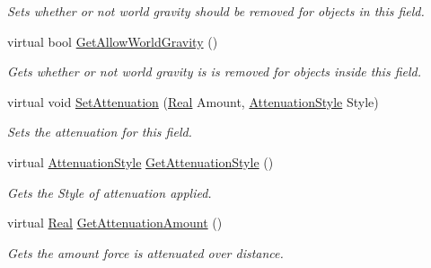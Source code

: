 \begin{DoxyCompactItemize}
\begin{DoxyCompactList}\small\item\em Sets whether or not world gravity should be removed for objects in this field. \item\end{DoxyCompactList}\item 
virtual bool \hyperlink{classphys_1_1GravityWell_a6308d71921477e9031173e6900237f21}{GetAllowWorldGravity} ()
\begin{DoxyCompactList}\small\item\em Gets whether or not world gravity is is removed for objects inside this field. \item\end{DoxyCompactList}\item 
virtual void \hyperlink{classphys_1_1GravityWell_a736d4b9b541b3cada4b0a31f422d6020}{SetAttenuation} (\hyperlink{namespacephys_af7eb897198d265b8e868f45240230d5f}{Real} Amount, \hyperlink{classphys_1_1GravityWell_a72d0da5f140b91bc364f2c46e7536e1f}{AttenuationStyle} Style)
\begin{DoxyCompactList}\small\item\em Sets the attenuation for this field. \item\end{DoxyCompactList}\item 
virtual \hyperlink{classphys_1_1GravityWell_a72d0da5f140b91bc364f2c46e7536e1f}{AttenuationStyle} \hyperlink{classphys_1_1GravityWell_af6720913923c6376c893bc34bca7e8a4}{GetAttenuationStyle} ()
\begin{DoxyCompactList}\small\item\em Gets the Style of attenuation applied. \item\end{DoxyCompactList}\item 
virtual \hyperlink{namespacephys_af7eb897198d265b8e868f45240230d5f}{Real} \hyperlink{classphys_1_1GravityWell_abcf5f7983c33307a54b362988b2d562a}{GetAttenuationAmount} ()
\begin{DoxyCompactList}\small\item\em Gets the amount force is attenuated over distance. \item\end{DoxyCompactList}\end{DoxyCompactItemize}
